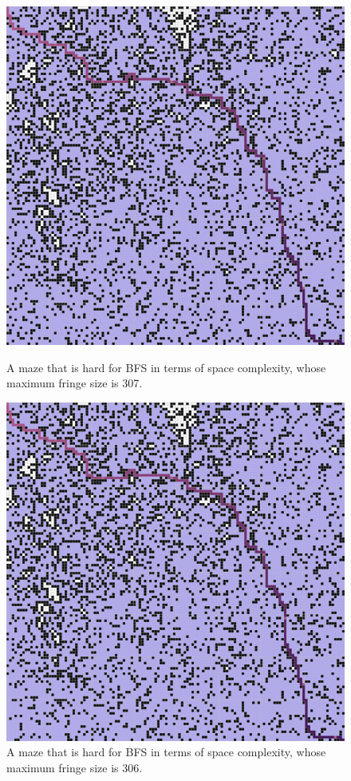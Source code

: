\documentclass[letter]{article}
\begin{document}
\begin{enumerate}[resume]
\begin{enumerate}
\begin{enumerate}
\begin{figure}
					\includegraphics[width=\textwidth]{../pics/bf/307.png}
					\caption{\label{fig:bf2}A maze that is hard for BFS in terms of space complexity, whose maximum fringe size is 307. }
					\endminipage\hfill
					\includegraphics[width=\textwidth]{../pics/bf/306.png}
					\caption{\label{fig:bf3} A maze that is hard for BFS in terms of space complexity, whose maximum fringe size is 306. }
					\endminipage
					\endminipage 
				\end{figure}
				

\end{enumerate}
\end{enumerate}
\end{enumerate}
\end{document}
